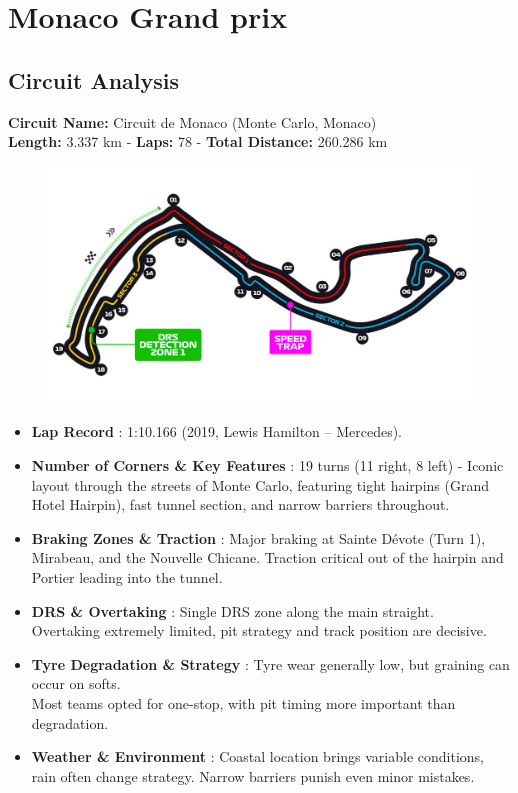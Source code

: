 \section{Monaco Grand prix}

\subsection{Circuit Analysis}

\textbf{Circuit Name:} Circuit de Monaco (Monte Carlo, Monaco) \\
\textbf{Length:} 3.337 km - \textbf{Laps:} 78 - \textbf{Total Distance:} 260.286 km

\begin{figure}[H]
    \centering
    \includegraphics[width=0.75\linewidth]{images/8.Monaco_Circuit.jpg}
\end{figure}

\begin{itemize}
    \item \textbf{Lap Record} : 1:10.166 (2019, Lewis Hamilton – Mercedes).
    
    \item \textbf{Number of Corners \& Key Features} : 19 turns (11 right, 8 left) - Iconic layout through the streets of Monte Carlo, featuring tight hairpins (Grand Hotel Hairpin), fast tunnel section, and narrow barriers throughout.
    
    \item \textbf{Braking Zones \& Traction} : Major braking at Sainte Dévote (Turn 1), Mirabeau, and the Nouvelle Chicane. Traction critical out of the hairpin and Portier leading into the tunnel.
    
    \item \textbf{DRS \& Overtaking} : Single DRS zone along the main straight.\\
    Overtaking extremely limited, pit strategy and track position are decisive.
    
    \item \textbf{Tyre Degradation \& Strategy} : Tyre wear generally low, but graining can occur on softs.\\
    Most teams opted for one-stop, with pit timing more important than degradation.
    
    \item \textbf{Weather \& Environment} : Coastal location brings variable conditions, rain often change strategy. Narrow barriers punish even minor mistakes.
\end{itemize}

